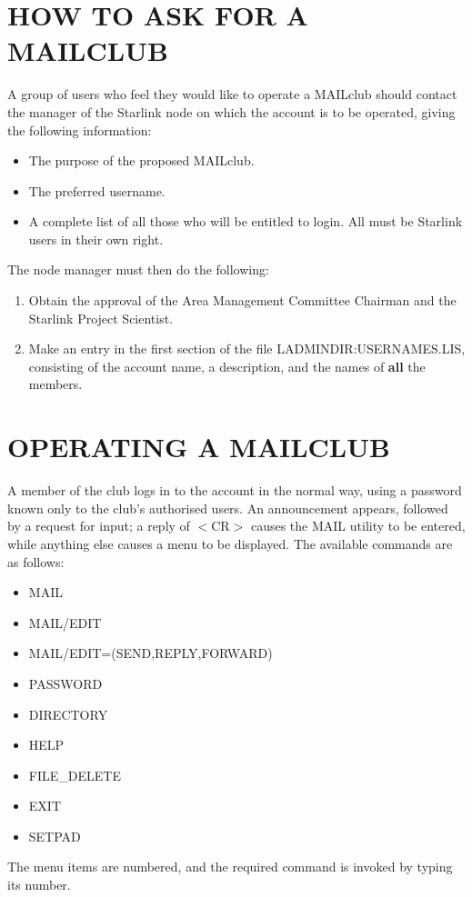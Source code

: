 \section{HOW TO ASK FOR A MAILCLUB}
A group of users who feel they would like to operate a MAILclub
should contact the manager of the Starlink node on which the account
is to be operated, giving the following information:
\begin{itemize}
\item The purpose of the proposed MAILclub.
\item The preferred username.
\item A complete list of all those who will be entitled
      to login.  All must be Starlink users in their own right.
\end{itemize}
The node manager
must then do the following:
\begin{enumerate}
\item Obtain the approval of
      the Area Management Committee Chairman and the Starlink
      Project Scientist.
\item Make an entry in
      the first section of the file LADMINDIR:USERNAMES.LIS, consisting
      of the
      account name, a description, and the names of {\bf all} the
      members.
\end{enumerate}
\section{OPERATING A MAILCLUB}
A member of the club logs in to the account in the normal way, using
a password known only to the club's authorised users.  An
announcement appears, followed by a request for input;
a reply of $<$CR$>$ causes the MAIL utility to be
entered, while anything else causes a menu to be displayed.  The
available commands are as follows:
\begin{itemize}
\item MAIL
\item MAIL/EDIT
\item MAIL/EDIT=(SEND,REPLY,FORWARD)
\item PASSWORD
\item DIRECTORY
\item HELP
\item FILE\_DELETE
\item EXIT
\item SETPAD
\end{itemize}
The menu items are numbered, and the required command is
invoked by typing its number.

